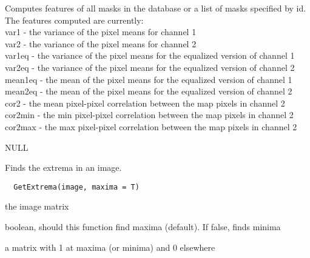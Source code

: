 \documentclass[a4paper]{book}
\begin{document}
%
\begin{Details}\relax
Computes features of all masks in the database or a list
of masks specified by id.  The features computed are
currently:\\{} var1 - the variance of the pixel means for
channel 1 \\{} var2 - the variance of the pixel means for
channel 2\\{} var1eq - the variance of the pixel means for
the equalized version of channel 1\\{} var2eq - the
variance of the pixel means for the equalized version of
channel 2\\{} mean1eq - the mean of the pixel means for
the equalized version of channel 1\\{} mean2eq - the mean
of the pixel means for the equalized version of channel
2\\{} cor2 - the mean pixel-pixel correlation between the
map pixels in channel 2\\{} cor2min - the min pixel-pixel
correlation between the map pixels in channel 2\\{}
cor2max - the max pixel-pixel correlation between the map
pixels in channel 2\\{}
\end{Details}
%
\begin{Value}
NULL
\end{Value}
%
\begin{Description}\relax
Finds the extrema in an image.
\end{Description}
%
\begin{Usage}
\begin{verbatim}
  GetExtrema(image, maxima = T)
\end{verbatim}
\end{Usage}
%
\begin{Arguments}
\begin{ldescription}
\item[\code{image}] the image matrix

\item[\code{maxima}] boolean, should this function find maxima
(default).  If false, finds minima
\end{ldescription}
\end{Arguments}
%
\begin{Value}
a matrix with 1 at maxima (or minima) and 0 elsewhere
\end{Value}
\end{document}
